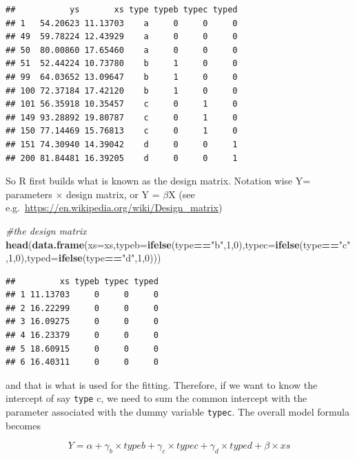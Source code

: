 \documentclass[
]{book}
\newenvironment{Shaded}{\begin{snugshade}}{\end{snugshade}}
\newcommand{\AttributeTok}[1]{\textcolor[rgb]{0.13,0.29,0.53}{#1}}
\newcommand{\CommentTok}[1]{\textcolor[rgb]{0.56,0.35,0.01}{\textit{#1}}}
\newcommand{\DecValTok}[1]{\textcolor[rgb]{0.00,0.00,0.81}{#1}}
\newcommand{\FunctionTok}[1]{\textcolor[rgb]{0.13,0.29,0.53}{\textbf{#1}}}
\newcommand{\NormalTok}[1]{#1}
\newcommand{\SpecialCharTok}[1]{\textcolor[rgb]{0.81,0.36,0.00}{\textbf{#1}}}
\newcommand{\StringTok}[1]{\textcolor[rgb]{0.31,0.60,0.02}{#1}}
\begin{document}
\begin{verbatim}
##           ys       xs type typeb typec typed
## 1   54.20623 11.13703    a     0     0     0
## 49  59.78224 12.43929    a     0     0     0
## 50  80.00860 17.65460    a     0     0     0
## 51  52.44224 10.73780    b     1     0     0
## 99  64.03652 13.09647    b     1     0     0
## 100 72.37184 17.42120    b     1     0     0
## 101 56.35918 10.35457    c     0     1     0
## 149 93.28892 19.80787    c     0     1     0
## 150 77.14469 15.76813    c     0     1     0
## 151 74.30940 14.39042    d     0     0     1
## 200 81.84481 16.39205    d     0     0     1
\end{verbatim}

So R first builds what is known as the design matrix. Notation wise Y= parameters \(\times\) design matrix, or Y = \(\beta\)X (see e.g.~\url{https://en.wikipedia.org/wiki/Design_matrix})

\begin{Shaded}
\begin{Highlighting}[]
\CommentTok{\#the design matrix}
\FunctionTok{head}\NormalTok{(}\FunctionTok{data.frame}\NormalTok{(}\AttributeTok{xs=}\NormalTok{xs,}\AttributeTok{typeb=}\FunctionTok{ifelse}\NormalTok{(type}\SpecialCharTok{==}\StringTok{"b"}\NormalTok{,}\DecValTok{1}\NormalTok{,}\DecValTok{0}\NormalTok{),}\AttributeTok{typec=}\FunctionTok{ifelse}\NormalTok{(type}\SpecialCharTok{==}\StringTok{"c"}\NormalTok{,}\DecValTok{1}\NormalTok{,}\DecValTok{0}\NormalTok{),}\AttributeTok{typed=}\FunctionTok{ifelse}\NormalTok{(type}\SpecialCharTok{==}\StringTok{"d"}\NormalTok{,}\DecValTok{1}\NormalTok{,}\DecValTok{0}\NormalTok{)))}
\end{Highlighting}
\end{Shaded}

\begin{verbatim}
##         xs typeb typec typed
## 1 11.13703     0     0     0
## 2 16.22299     0     0     0
## 3 16.09275     0     0     0
## 4 16.23379     0     0     0
## 5 18.60915     0     0     0
## 6 16.40311     0     0     0
\end{verbatim}

and that is what is used for the fitting. Therefore, if we want to know the intercept of say \texttt{type} c, we need to sum the common intercept with the parameter associated with the dummy variable \texttt{typec}. The overall model formula becomes

\[Y= \alpha + \gamma_b × typeb + \gamma_c × typec + \gamma_d × typed +  \beta × xs
\]
\end{document}
